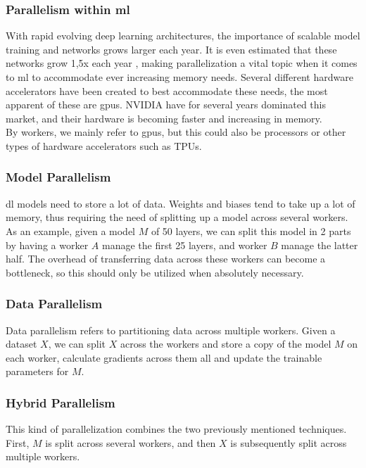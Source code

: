 \subsubsection{Parallelism within \acrlong{ml}}

With rapid evolving deep learning architectures, the importance of scalable model training and networks grows larger each year. It is even estimated that these networks grow 1,5x each year \cite{9499913}, making parallelization a vital topic when it comes to \acrlong{ml} to accommodate ever increasing memory needs. Several different hardware accelerators have been created to best accommodate these needs, the most apparent of these are \acrshort{gpu}s. NVIDIA have for several years dominated this market, and their hardware is becoming faster and increasing in memory. \\

By workers, we mainly refer to \acrshort{gpu}s, but this could also be processors or other types of hardware accelerators such as TPUs.


\subsubsection{Model Parallelism}

\acrshort{dl} models need to store a lot of data. Weights and biases tend to take up a lot of memory, thus requiring the need of splitting up a model across several workers. As an example, given a model $M$ of 50 layers, we can split this model in 2 parts by having a worker $A$ manage the first 25 layers, and worker $B$ manage the latter half.
The overhead of transferring data across these workers can become a bottleneck, so this should only be utilized when absolutely necessary.

\subsubsection{Data Parallelism}

Data parallelism refers to partitioning data across multiple workers. Given a dataset $X$, we can split $X$ across the workers and store a copy of the model $M$ on each worker, calculate gradients across them all and update the trainable parameters for $M$. 

\subsubsection{Hybrid Parallelism}

This kind of parallelization combines the two previously mentioned techniques. First, $M$ is split across several workers, and then $X$ is subsequently split across multiple workers. 